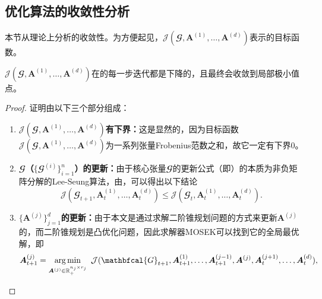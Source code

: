 \subsection{优化算法的收敛性分析}\label{sec:conv}
本节从理论上分析的收敛性。为方便起见，$\mathcal{J}(\mathbfcal{G},\boldsymbol{A}^{(1)},\allowbreak\ldots,\allowbreak\boldsymbol{A}^{(d)})$表示的目标函数。
\begin{theorem}\kaishu
    $\mathcal{J}(\mathbfcal{G},\boldsymbol{A}^{(1)},\ldots,\boldsymbol{A}^{(d)})$在的每一步迭代都是下降的，且最终会收敛到局部极小值点。
\end{theorem}
\begin{proof}
证明由以下三个部分组成：
    \begin{enumerate}[noitemsep]
        \item \textbf{$\mathcal{J}(\mathbfcal{G},\boldsymbol{A}^{(1)},\ldots,\boldsymbol{A}^{(d)})$有下界：}这是显然的，因为目标函数$\mathcal{J}(\mathbfcal{G},\boldsymbol{A}^{(1)},\ldots,\boldsymbol{A}^{(d)})$为一系列张量Frobenius范数之和，故它一定有下界$0$。\vspace{1em}
        \item \textbf{$\mathbfcal{G}$（$\{\mathbfcal{G}^{(i)}\}_{i=1}^{n}$）的更新：}由于核心张量$\mathbfcal{G}$的更新公式（即）的本质为非负矩阵分解的Lee-Seung算法，由，可以得出以下结论
        \begin{equation*}
        \label{eq:conv1}
            \mathcal{J}(\mathbfcal{G}_{t+1},\boldsymbol{A}^{(1)}_{t},\ldots,\boldsymbol{A}^{(d)}_{t}) \le \mathcal{J}(\mathbfcal{G}_{t}, \boldsymbol{A}^{(1)}_{t},\ldots,\boldsymbol{A}^{(d)}_{t}).
        \end{equation*}
        \item \textbf{$\{\boldsymbol{A}^{(j)}\}_{j=1}^{d}$的更新：}由于本文是通过求解二阶锥规划问题的方式来更新$\boldsymbol{A}^{(j)}$的，而二阶锥规划是凸优化问题，因此求解器MOSEK可以找到它的全局最优解，即
        \begin{equation*}
            \boldsymbol{A}^{(j)}_{t+1}=\underset{\boldsymbol{A}^{(j)}\in\mathbb{R}_{+}^{n_j \times r_j}}{\arg\min}\Hquad\mathcal{J}(\mathbfcal{G}_{t+1},\allowbreak \boldsymbol{A}^{(1)}_{t+1},\allowbreak \ldots, \allowbreak \boldsymbol{A}^{(j-1)}_{t+1}, \allowbreak \boldsymbol{A}^{(j)}, \allowbreak \boldsymbol{A}^{(j+1)}_{t},\allowbreak \ldots,\allowbreak \boldsymbol{A}^{(d)}_{t}),
        \end{equation*}

\end{enumerate}
\end{proof}
